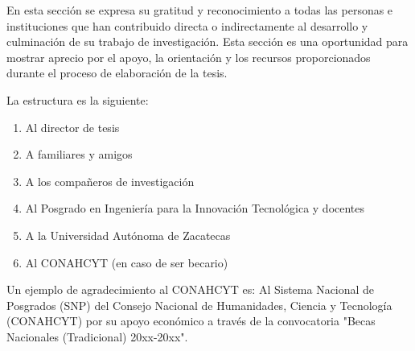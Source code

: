 En esta sección se expresa su gratitud y reconocimiento a todas las personas e instituciones que han contribuido directa o indirectamente al desarrollo y culminación de su trabajo de investigación. Esta sección es una oportunidad para mostrar aprecio por el apoyo, la orientación y los recursos proporcionados durante el proceso de elaboración de la tesis.

La estructura es la siguiente:

\begin{enumerate}
    \item Al director de tesis
    \item A familiares y amigos
    \item A los compañeros de investigación
    \item Al Posgrado en Ingeniería para la Innovación Tecnológica y docentes
    \item A la Universidad Autónoma de Zacatecas
    \item Al CONAHCYT (en caso de ser becario)
\end{enumerate}

Un ejemplo de agradecimiento al CONAHCYT es: Al Sistema Nacional de Posgrados (SNP) del Consejo Nacional de Humanidades, Ciencia y Tecnología (CONAHCYT) por su apoyo económico a través de la convocatoria "Becas Nacionales (Tradicional) 20xx-20xx".